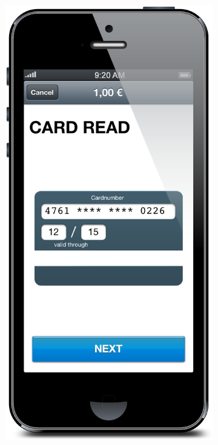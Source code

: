 \documentclass[a4paper, oneside]{csthesis}
\begin{document}
\begin{figure}
\begin{subfigure}[b]{0.12\textwidth}
                \label{fig:flow3}
        \end{subfigure}
        \begin{subfigure}[b]{0.12\textwidth}
                \centering
                \includegraphics[width=\textwidth]{figures/flow4.png}

\end{subfigure}
\end{figure}
\end{document}
